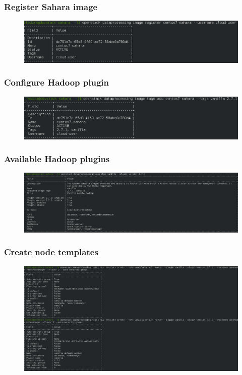 \begin{frame}
	\frametitle{Register Sahara image}
	\begin{figure}
		\includegraphics[width=1\linewidth]{images/2-register_sahara_image.png}
	\end{figure}
\end{frame}

\begin{frame}
	\frametitle{Configure Hadoop plugin}
	\begin{figure}
		\includegraphics[width=1\linewidth]{images/3-configure_hadoop_plugin_tags.png}
	\end{figure}
\end{frame}

\begin{frame}
	\frametitle{Available Hadoop plugins}
	\begin{figure}
		\includegraphics[width=1\linewidth]{images/4-available_sahara_plugins.png}
	\end{figure}
\end{frame}

\begin{frame}
	\frametitle{Create node templates}
	\begin{figure}
		\includegraphics[width=1\linewidth]{images/5-create_node_templates.png}
	\end{figure}
\end{frame}


